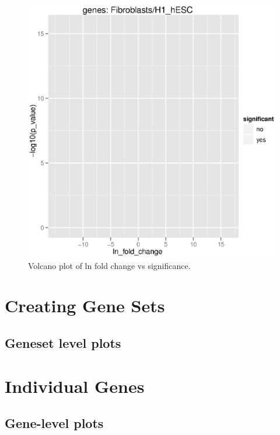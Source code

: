 \documentclass[10pt]{article}
\begin{document}
\begin{figure}[ht]
\begin{center}
\includegraphics{cummeRbund-manual-global_plots_volcano}

\end{center}
\caption{Volcano plot of ln fold change vs significance.}
\end{figure}

\clearpage

\section{Creating Gene Sets}

\subsection{Geneset level plots}

\section{Individual Genes}

\subsection{Gene-level plots}
\end{document}
